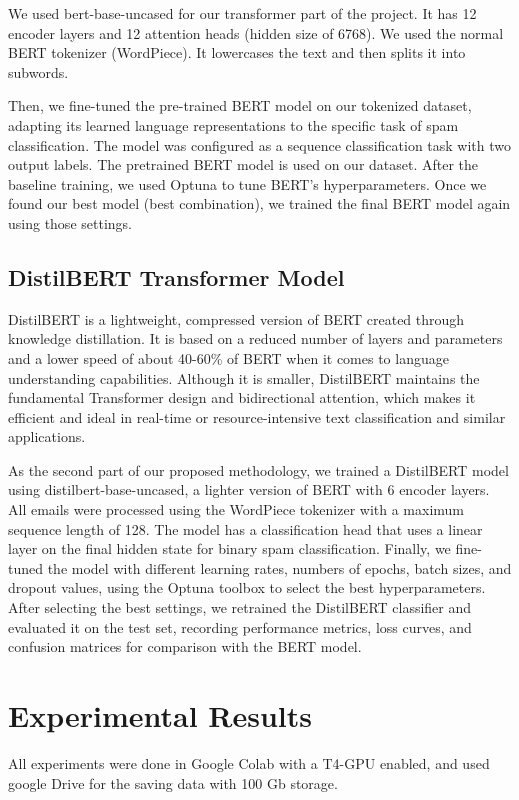 \documentclass{article}
\begin{document}
We used bert-base-uncased for our transformer part of the project. It has 12 encoder layers and 12 attention heads (hidden size of 6768). We used the normal BERT tokenizer (WordPiece). It lowercases the text and then splits it into subwords. 

Then, we fine-tuned the pre-trained BERT model on our tokenized dataset, adapting its learned language representations to the specific task of spam classification. The model was configured as a sequence classification task with two output labels. The pretrained BERT model is used on our dataset. After the baseline training, we used Optuna to tune BERT's hyperparameters. Once we found our best model (best combination), we trained the final BERT model again using those settings.


\subsection{DistilBERT Transformer Model}
DistilBERT is a lightweight, compressed version of BERT created through knowledge distillation. It is based on a reduced number of layers and parameters and a lower speed of about 40-60\% of BERT when it comes to language understanding capabilities. Although it is smaller, DistilBERT maintains the fundamental Transformer design and bidirectional attention, which makes it efficient and ideal in real-time or resource-intensive text classification and similar applications.

As the second part of our proposed methodology, we trained a DistilBERT model using distilbert-base-uncased, a lighter version of BERT with 6 encoder layers. All emails were processed using the WordPiece tokenizer with a maximum sequence length of 128. The model has a classification head that uses a linear layer on the final hidden state for binary spam classification. Finally, we fine-tuned the model with different learning rates, numbers of epochs, batch sizes, and dropout values, using the Optuna toolbox to select the best hyperparameters. After selecting the best settings, we retrained the DistilBERT classifier and evaluated it on the test set, recording performance metrics, loss curves, and confusion matrices for comparison with the BERT model.




\section{Experimental Results}
All experiments were done in Google Colab with a T4-GPU enabled, and used google Drive for the saving data with 100 Gb storage. 
\end{document}
